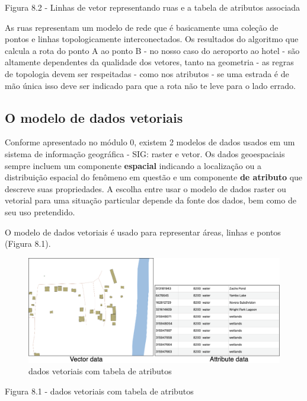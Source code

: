 \documentclass[
]{book}
\begin{document}
Figura 8.2 - Linhas de vetor representando ruas e a tabela de atributos associada

As ruas representam um modelo de rede que é basicamente uma coleção de pontos e linhas topologicamente interconectados. Os resultados do algoritmo que calcula a rota do ponto A ao ponto B - no nosso caso do aeroporto ao hotel - são altamente dependentes da qualidade dos vetores, tanto na geometria - as regras de topologia devem ser respeitadas - como nos atributos - se uma estrada é de mão única isso deve ser indicado para que a rota não te leve para o lado errado.

\hypertarget{o-modelo-de-dados-vetoriais}{%
\subsection{O modelo de dados vetoriais}\label{o-modelo-de-dados-vetoriais}}

Conforme apresentado no módulo 0, existem 2 modelos de dados usados \hspace{0pt}\hspace{0pt}em um sistema de informação geográfica - SIG: raster e vetor. Os dados geoespaciais sempre incluem um componente \textbf{espacial} indicando a localização ou a distribuição espacial do fenômeno em questão e um componente \textbf{de atributo} que descreve suas propriedades. A escolha entre usar o modelo de dados raster ou vetorial para uma situação particular depende da fonte dos dados, bem como de seu uso pretendido.

O modelo de dados vetoriais é usado para representar áreas, linhas e pontos (Figura 8.1).

\begin{figure}
\centering
\includegraphics{media/modulo8/fig83.png}
\caption{dados vetoriais com tabela de atributos}
\end{figure}

Figura 8.1 - dados vetoriais com tabela de atributos
\end{document}

